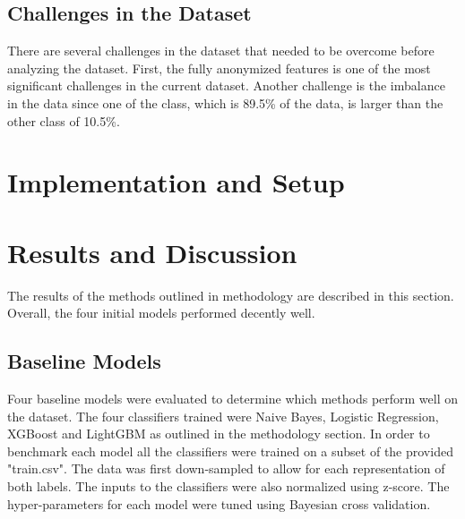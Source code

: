 \documentclass[journal,twoside,web]{ieeecolor}
\begin{document}

\subsection{Challenges in the Dataset}

There are several challenges in the dataset that needed to be overcome before analyzing the dataset. First, the fully anonymized  features is one of the most significant challenges in the current dataset.  Another challenge is the imbalance in the data since one of the class, which is 89.5\% of the data, is larger than the other class of 10.5\%.

\section{Implementation and Setup}



\section{Results and Discussion}
The results of the methods outlined in methodology are described in this section. Overall, the four initial models performed decently well. 

\subsection{Baseline Models}

Four baseline models were evaluated to determine which methods perform well on the dataset. The four classifiers trained were Naive Bayes, Logistic Regression, XGBoost and LightGBM as outlined in the methodology section. In order to benchmark each model all the classifiers were trained on a subset of the provided "train.csv". The data was first down-sampled to allow for each representation of both labels. The inputs to the classifiers were also normalized using z-score. The hyper-parameters for each model were tuned using Bayesian cross validation. 
\end{document}
